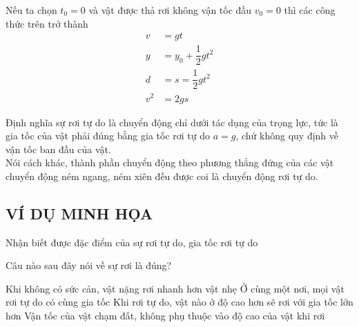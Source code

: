 \begin{tomtat}
	Nếu ta chọn $t_{0}=0$ và vật được thả rơi không vận tốc đầu $v_0=0$ thì các công thức trên trở thành
	\begin{align*}
		v&=gt\\	
		y&=y_0+\dfrac{1}{2}gt^{2}\\
		d&=s=\dfrac{1}{2}gt^{2}\\
		v^2&=2gs
	\end{align*}
	\begin{luuy}
			Định nghĩa sự rơi tự do là chuyển động chỉ dưới tác dụng của trọng lực, tức là gia tốc của vật phải đúng bằng gia tốc rơi tự do $a=g$, chứ không quy định về vận tốc ban đầu của vật. \\
		Nói cách khác, thành phần chuyển động theo phương thẳng đứng của các vật chuyển động ném ngang, ném xiên đều được coi là chuyển động rơi tự do.
	\end{luuy}
	
	
	
\end{tomtat}
\subsection{VÍ DỤ MINH HỌA}
\begin{dang}{Nhận biết được đặc điểm của sự rơi tự do, gia tốc rơi tự do}
	\end{dang}
	\begin{vd}
		Câu nào sau đây nói về sự rơi là đúng?
		
		\choice
		{Khi không có sức cản, vật nặng rơi nhanh hơn vật nhẹ}
		{\True Ở cùng một nơi, mọi vật rơi tự do có cùng gia tốc}
		{Khi rơi tự do, vật nào ở độ cao hơn sẽ rơi với gia tốc lớn hơn}
		{Vận tốc của vật chạm đất, không phụ thuộc vào độ cao của vật khi rơi}
	\end{vd}
	
